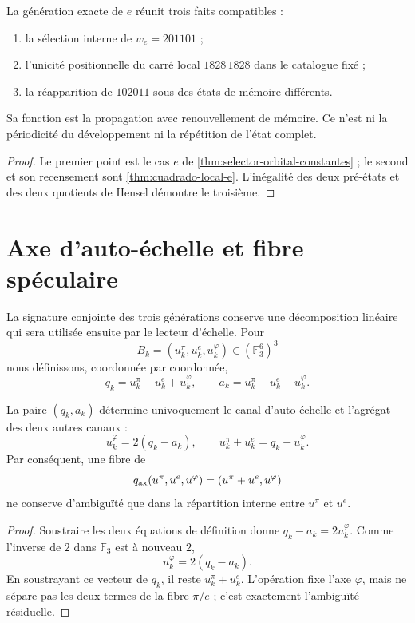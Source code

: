 \begin{proposition}
\label{prop:propagacion-e-rev6}
La génération exacte de \(e\) réunit trois faits compatibles :
\begin{enumerate}
\item la sélection interne de \(w_e=201101\) ;
\item l'unicité positionnelle du carré local \(1828\,1828\) dans le
catalogue fixé ;
\item la réapparition de \(102011\) sous des états de mémoire différents.
\end{enumerate}
Sa fonction est la propagation avec renouvellement de mémoire. Ce n'est ni la périodicité du
développement ni la répétition de l'état complet.
\end{proposition}

\begin{proof}
Le premier point est le cas \(e\) de
\cref{thm:selector-orbital-constantes} ; le second et son recensement sont
\cref{thm:cuadrado-local-e}. L'inégalité des deux pré-états et des
deux quotients de Hensel démontre le troisième.
\end{proof}

\section{Axe d'auto-échelle et fibre spéculaire}

La signature conjointe des trois générations conserve une décomposition linéaire
qui sera utilisée ensuite par le lecteur d'échelle. Pour
\[
 B_k=(u_k^\pi,u_k^e,u_k^\varphi)
 \in(\mathbb F_3^6)^3
\]
nous définissons, coordonnée par coordonnée,
\[
 q_k=u_k^\pi+u_k^e+u_k^\varphi,
 \qquad
 a_k=u_k^\pi+u_k^e-u_k^\varphi.
\]

\begin{theorem}
\label{thm:eje-espejo-nonadico}
La paire \((q_k,a_k)\) détermine univoquement le canal d'auto-échelle et
l'agrégat des deux autres canaux :
\[
 u_k^\varphi=2(q_k-a_k),
 \qquad
 u_k^\pi+u_k^e=q_k-u_k^\varphi.
\]
Par conséquent, une fibre de
\[
 q_{\rm ax}(u^\pi,u^e,u^\varphi)
 =(u^\pi+u^e,u^\varphi)
\]
ne conserve d'ambiguïté que dans la répartition interne entre \(u^\pi\) et \(u^e\).
\end{theorem}

\begin{proof}
Soustraire les deux équations de définition donne
\(q_k-a_k=2u_k^\varphi\). Comme l'inverse de \(2\) dans \(\mathbb F_3\) est
à nouveau \(2\),
\[
u_k^\varphi=2(q_k-a_k).
\]
En soustrayant ce vecteur de \(q_k\), il reste
\(u_k^\pi+u_k^e\). L'opération fixe l'axe \(\varphi\), mais ne sépare pas
les deux termes de la fibre \(\pi/e\) ; c'est exactement l'ambiguïté
résiduelle.
\end{proof}

